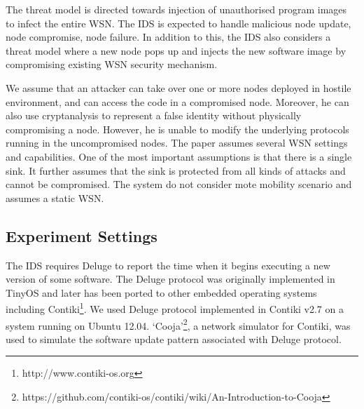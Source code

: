 \documentclass[conference,manuscript]{IEEEtran}
\begin{document}
The threat model is directed towards injection of unauthorised program images to infect the entire WSN.
The IDS is expected to handle malicious node update, node compromise, node failure.
In addition to this, the IDS also considers a threat model where a new node pops up and injects the new software image by compromising existing WSN security mechanism.

We assume that an  attacker  can take over one or more nodes deployed in hostile environment, and can access the code in a compromised node. 
Moreover, he can also use cryptanalysis to represent a false identity without physically compromising a node.
However, he is unable to modify the underlying protocols running in the uncompromised nodes.
The paper assumes several WSN settings and capabilities.
One of the most important assumptions is that there is a single  sink. 
It further assumes that the sink is protected from all kinds of attacks and cannot be compromised. 
The system do not consider mote mobility scenario and assumes a static WSN.


\subsection*{Experiment Settings}
\label{subsec:sim_env}

The IDS requires Deluge to report the time when it begins  executing  a new version of some software.
The Deluge protocol was originally implemented in TinyOS and later has been ported to other embedded operating systems including Contiki\footnote{http://www.contiki-os.org}. 
We used Deluge protocol implemented in Contiki v2.7 on a system running on Ubuntu 12.04.
`Cooja'\footnote{https://github.com/contiki-os/contiki/wiki/An-Introduction-to-Cooja}, a network simulator for Contiki, was used to simulate the software update pattern associated with Deluge protocol.
\end{document}
